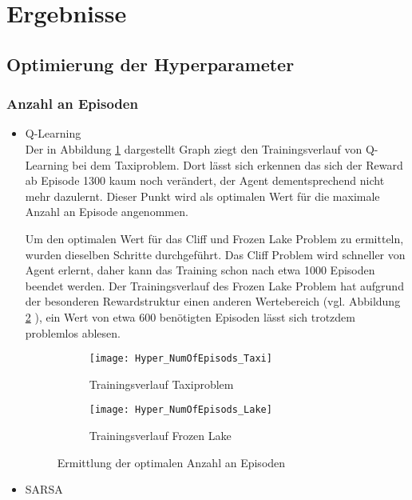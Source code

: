 \section{Ergebnisse}

\subsection{Optimierung der Hyperparameter}

\subsubsection{Anzahl an Episoden}
\begin{itemize}
    \item Q-Learning\\
    Der in Abbildung \ref{fig:NumOfEpisods_Taxi} dargestellt Graph ziegt den Trainingsverlauf von Q-Learning bei dem Taxiproblem. Dort lässt sich erkennen das sich der Reward ab Episode 1300 kaum noch verändert, der Agent dementsprechend nicht mehr dazulernt. 
    Dieser Punkt wird als optimalen Wert für die maximale Anzahl an Episode angenommen.

    Um den optimalen Wert für das Cliff und Frozen Lake Problem zu ermitteln, wurden dieselben Schritte durchgeführt.
    Das Cliff Problem wird schneller von Agent erlernt, daher kann das Training schon nach etwa 1000 Episoden beendet werden.
    Der Trainingsverlauf des Frozen Lake Problem hat aufgrund der besonderen Rewardstruktur einen anderen Wertebereich (vgl. Abbildung \ref{fig:NumOfEpisods_Lake} ), ein Wert von etwa 600 benötigten Episoden lässt sich trotzdem problemlos ablesen.
    
    \begin{figure}[H]
      \centering
      \begin{subfigure}{.5\textwidth}
        \centering
        \texttt{[image: Hyper\_NumOfEpisods\_Taxi]}
        \caption{Trainingsverlauf Taxiproblem}
        \label{fig:NumOfEpisods_Taxi}
      \end{subfigure}%
      \begin{subfigure}{.5\textwidth}
        \centering
        \texttt{[image: Hyper\_NumOfEpisods\_Lake]}
        \caption{Trainingsverlauf Frozen Lake}
        \label{fig:NumOfEpisods_Lake}
      \end{subfigure}
      \caption{Ermittlung der optimalen Anzahl an Episoden}
      \label{fig:NumOfEpisods_Taxi_Q-Learning}
  \end{figure}

    \item SARSA\\
    
\end{itemize}

